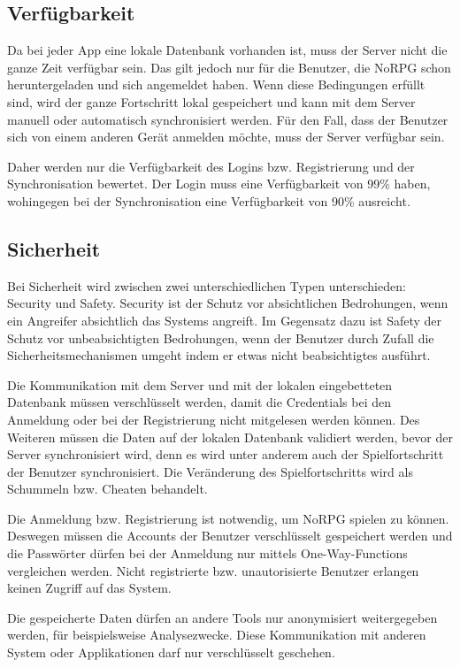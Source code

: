 	\subsection{Verfügbarkeit}
		Da bei jeder App eine lokale Datenbank vorhanden ist, muss der Server nicht die ganze Zeit verfügbar sein. Das gilt jedoch nur für die Benutzer, die NoRPG schon heruntergeladen und sich angemeldet haben. Wenn diese Bedingungen erfüllt sind, wird der ganze Fortschritt lokal gespeichert und kann mit dem Server manuell oder automatisch synchronisiert werden. Für den Fall, dass der Benutzer sich von einem anderen Gerät anmelden möchte, muss der Server verfügbar sein.
		
		Daher werden nur die Verfügbarkeit des Logins bzw. Registrierung und der Synchronisation bewertet. Der Login muss eine Verfügbarkeit von 99\% haben, wohingegen bei der Synchronisation eine Verfügbarkeit von 90\% ausreicht.
		
	\subsection{Sicherheit}
		Bei Sicherheit wird zwischen zwei unterschiedlichen Typen unterschieden: Security und Safety. Security ist der Schutz vor absichtlichen Bedrohungen, wenn ein Angreifer absichtlich das Systems angreift. Im Gegensatz dazu ist Safety der Schutz vor unbeabsichtigten Bedrohungen, wenn der Benutzer durch Zufall die Sicherheitsmechanismen umgeht indem er etwas nicht beabsichtigtes ausführt.
		
		Die Kommunikation mit dem Server und mit der lokalen eingebetteten Datenbank müssen verschlüsselt werden, damit die Credentials bei den Anmeldung oder bei der Registrierung nicht mitgelesen werden können. Des Weiteren müssen die Daten auf der lokalen Datenbank validiert werden, bevor der Server synchronisiert wird, denn es wird unter anderem auch der Spielfortschritt der Benutzer synchronisiert. Die Veränderung des Spielfortschritts wird als Schummeln bzw. Cheaten behandelt.
		
		Die Anmeldung bzw. Registrierung ist notwendig, um NoRPG spielen zu können. Deswegen müssen die Accounts der Benutzer verschlüsselt gespeichert werden und die Passwörter dürfen bei der Anmeldung nur mittels One-Way-Functions vergleichen werden. Nicht registrierte bzw. unautorisierte Benutzer erlangen keinen Zugriff auf das System.
		
		Die gespeicherte Daten dürfen an andere Tools nur anonymisiert weitergegeben werden, für beispielsweise Analysezwecke. Diese Kommunikation mit anderen System oder Applikationen darf nur verschlüsselt geschehen.
		
